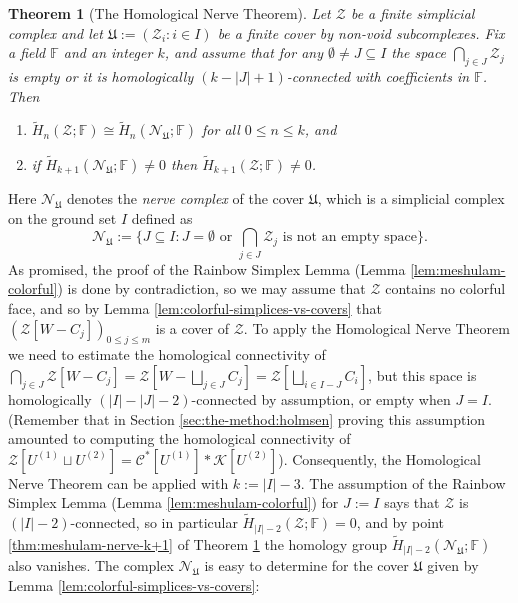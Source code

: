 \documentclass[a4paper,11pt,reqno, english]{amsart}
\newtheorem{theorem}{Theorem}[section]
\theoremstyle{definition}
\theoremstyle{remark}
\begin{document}
\begin{theorem}[The Homological Nerve Theorem]\label{thm:meshulam-nerve}
    Let $\mathscr{Z}$ be a finite simplicial complex and let $\mathfrak{U}:=(\mathscr{Z}_i:i\in I)$ be a finite cover by non-void subcomplexes. Fix a field $\mathbb{F}$ and an integer $k$, and assume that for any $\emptyset\neq J\subseteq I$ the space $\bigcap_{j\in J}\mathscr{Z}_j$ is empty or it is homologically $(k-|J|+1)$-connected with coefficients in $\mathbb{F}$. Then
    \begin{enumerate}[label=\normalfont{(\arabic*)}]
        \item\label{thm:meshulam-nerve:low-degrees} $\tilde{H}_n(\mathscr{Z};\mathbb{F})\cong\tilde{H}_n(\mathscr{N}_\mathfrak{U};\mathbb{F})$ for all $0\leq n\leq k$, and
        \item\label{thm:meshulam-nerve-k+1} if $\tilde{H}_{k+1}(\mathscr{N}_\mathfrak{U};\mathbb{F})\neq 0$ then $\tilde{H}_{k+1}(\mathscr{Z};\mathbb{F})\neq 0$.
    \end{enumerate}
\end{theorem}
Here $\mathscr{N}_\mathfrak{U}$ denotes the \emph{nerve complex} of the cover $\mathfrak{U}$, which is a simplicial complex on the ground set $I$ defined as
\[
    \mathscr{N}_\mathfrak{U}:=\{J\subseteq I: J=\emptyset\text{~or~}\bigcap_{j\in J}\mathscr{Z}_j\text{~is not an empty space}\}.
\]
As promised, the proof of the Rainbow Simplex Lemma (Lemma \ref{lem:meshulam-colorful}) is done by contradiction, so we may assume that $\mathscr{Z}$ contains no colorful face, and so by Lemma \ref{lem:colorful-simplices-vs-covers} that $(\mathscr{Z}[W-C_j])_{0\leq j\leq m}$ is a cover of $\mathscr{Z}$. To apply the Homological Nerve Theorem we need to estimate the homological connectivity of $\bigcap_{j\in J}\mathscr{Z}[W-C_j]=\mathscr{Z}[W-\bigsqcup_{j\in J}C_j]=\mathscr{Z}[\bigsqcup_{i\in I-J}C_i]$, but this space is homologically $(|I|-|J|-2)$-connected by assumption, or empty when $J=I$. (Remember that in Section \ref{sec:the-method:holmsen} proving this assumption amounted to computing the homological connectivity of $\mathscr{Z}[U^{(1)}\sqcup U^{(2)}]=\mathscr{C}^*[U^{(1)}]*\mathscr{K}[U^{(2)}]$). Consequently, the Homological Nerve Theorem can be applied with $k:=|I|-3$. The assumption of the Rainbow Simplex Lemma (Lemma \ref{lem:meshulam-colorful}) for $J:=I$ says that $\mathscr{Z}$ is $(|I|-2)$-connected, so in particular $\tilde{H}_{|I|-2}(\mathscr{Z};\mathbb{F})=0$, and by point \ref{thm:meshulam-nerve-k+1} of Theorem \ref{thm:meshulam-nerve} the homology group $\tilde{H}_{|I|-2}(\mathscr{N}_\mathfrak{U};\mathbb{F})$ also vanishes. The complex $\mathscr{N}_\mathfrak{U}$ is easy to determine for the cover $\mathfrak{U}$ given by Lemma \ref{lem:colorful-simplices-vs-covers}:
\end{document}
